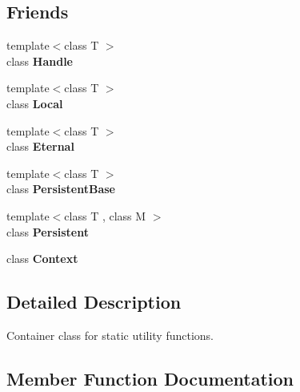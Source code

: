 \subsection*{Friends}
\begin{DoxyCompactItemize}
\item 
\hypertarget{classv8_1_1_v8_a67ca1a2d91273eaf85fb3d23ba8ce984}{}{\footnotesize template$<$class T $>$ }\\class {\bfseries Handle}\label{classv8_1_1_v8_a67ca1a2d91273eaf85fb3d23ba8ce984}

\item 
\hypertarget{classv8_1_1_v8_afb872edb4aac7ba55f0da004113aa2b0}{}{\footnotesize template$<$class T $>$ }\\class {\bfseries Local}\label{classv8_1_1_v8_afb872edb4aac7ba55f0da004113aa2b0}

\item 
\hypertarget{classv8_1_1_v8_adf5d8780aceb9310fb1246aae7ec348e}{}{\footnotesize template$<$class T $>$ }\\class {\bfseries Eternal}\label{classv8_1_1_v8_adf5d8780aceb9310fb1246aae7ec348e}

\item 
\hypertarget{classv8_1_1_v8_abb172e0bb22fc5fed7a3a66f29d046ce}{}{\footnotesize template$<$class T $>$ }\\class {\bfseries Persistent\+Base}\label{classv8_1_1_v8_abb172e0bb22fc5fed7a3a66f29d046ce}

\item 
\hypertarget{classv8_1_1_v8_ad845ec8872174be0a9ca9a3dd1898d30}{}{\footnotesize template$<$class T , class M $>$ }\\class {\bfseries Persistent}\label{classv8_1_1_v8_ad845ec8872174be0a9ca9a3dd1898d30}

\item 
\hypertarget{classv8_1_1_v8_ac26c806e60ca4a0547680edb68f6e39b}{}class {\bfseries Context}\label{classv8_1_1_v8_ac26c806e60ca4a0547680edb68f6e39b}

\end{DoxyCompactItemize}


\subsection{Detailed Description}
Container class for static utility functions. 

\subsection{Member Function Documentation}
\hypertarget{classv8_1_1_v8_a37aadf3536c772eb5bbf67fa7822679a}{}

